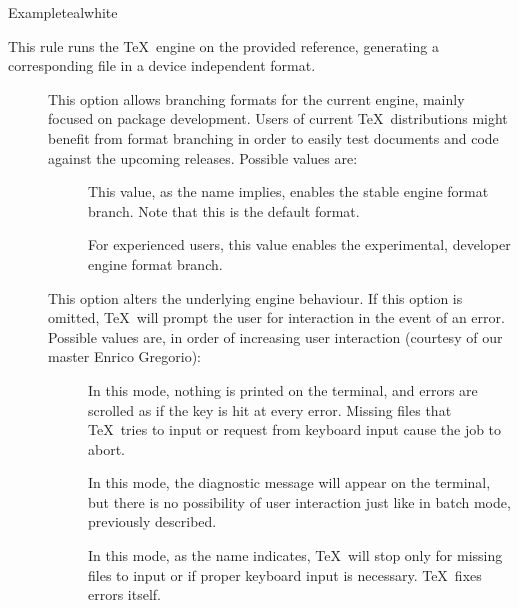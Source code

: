 \begin{description}
\begin{codebox}{Example}{teal}{\icnote}{white}
\end{codebox}

\item[\rulebox{uplatex}]
This rule runs the  \TeX\ engine on the provided  reference, generating a corresponding file in a device independent format.

\begin{description}
\item[] This option allows branching formats for the current engine, mainly focused on package development. Users of current \TeX\ distributions might benefit from format branching in order to easily test documents and code against the upcoming releases. Possible values are:

\begin{description}
\item[] This value, as the name implies, enables the stable engine format branch. Note that this is the default format.

\item[] For experienced users, this value enables the experimental, developer engine format branch.
\end{description}

\item[] This option alters the underlying engine behaviour. If this option is omitted, \TeX\ will prompt the user for interaction in the event of an error. Possible values are, in order of increasing user interaction (courtesy of our master Enrico Gregorio):

\begin{description}
\item[] In this mode, nothing is printed on the terminal, and errors are scrolled as if the  key is hit at every error. Missing files that \TeX\ tries to input or request from keyboard input cause the job to abort.

\item[] In this mode, the diagnostic message will appear on the terminal, but there is no possibility of user interaction just like in batch mode, previously described.

\item[] In this mode, as the name indicates, \TeX\ will stop only for missing files to input or if proper keyboard input is necessary. \TeX\ fixes errors itself.


\end{description}
\end{description}
\end{description}
